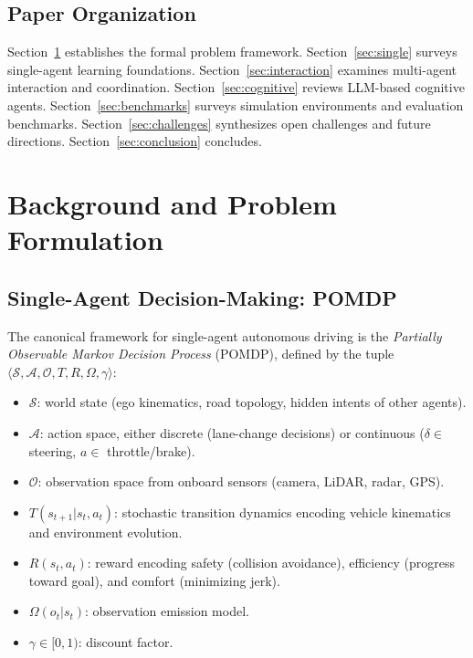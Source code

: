 \documentclass[12pt, a4paper]{article}
\begin{document}
\subsection{Paper Organization}
Section~\ref{sec:background} establishes the formal problem framework.
Section~\ref{sec:single} surveys single-agent learning foundations.
Section~\ref{sec:interaction} examines multi-agent interaction and coordination.
Section~\ref{sec:cognitive} reviews LLM-based cognitive agents.
Section~\ref{sec:benchmarks} surveys simulation environments and evaluation
benchmarks.
Section~\ref{sec:challenges} synthesizes open challenges and future directions.
Section~\ref{sec:conclusion} concludes.

\section{Background and Problem Formulation}
\label{sec:background}

\subsection{Single-Agent Decision-Making: POMDP}
The canonical framework for single-agent autonomous driving is the \emph{Partially
Observable Markov Decision Process} (POMDP), defined by the tuple
$\langle \mathcal{S}, \mathcal{A}, \mathcal{O}, T, R, \Omega, \gamma \rangle$:

\begin{itemize}[noitemsep]
  \item $\mathcal{S}$: world state (ego kinematics, road topology, hidden intents
        of other agents).
  \item $\mathcal{A}$: action space, either discrete (lane-change decisions) or
        continuous ($\delta \in$ steering, $a \in$ throttle/brake).
  \item $\mathcal{O}$: observation space from onboard sensors (camera, LiDAR,
        radar, GPS).
  \item $T(s_{t+1} | s_t, a_t)$: stochastic transition dynamics encoding vehicle
        kinematics and environment evolution.
  \item $R(s_t, a_t)$: reward encoding safety (collision avoidance), efficiency
        (progress toward goal), and comfort (minimizing jerk).
  \item $\Omega(o_t | s_t)$: observation emission model.
  \item $\gamma \in [0, 1)$: discount factor.
\end{itemize}
\end{document}

